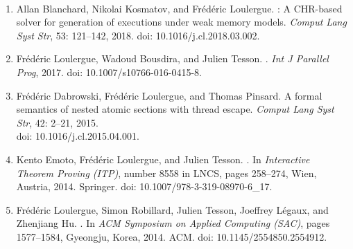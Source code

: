 \documentclass[11pt]{article}
\begin{document}
 ~

\begin{enumerate}
  
  \providecommand{\natexlab}[1]{#1}
  \providecommand{\url}[1]{\texttt{#1}}
  \expandafter\ifx\csname urlstyle\endcsname\relax
  \providecommand{\doi}[1]{doi: #1}\else
  \providecommand{\doi}{doi: \begingroup \urlstyle{rm}\Url}\fi

\item Allan Blanchard, Nikolai Kosmatov, and Fr\'{e}d\'{e}ric
  Loulergue.  : A {CHR}-based solver for
  generation of executions under weak memory models.  \newblock
  \emph{Comput Lang Syst Str}, 53: 121--142, 2018.  \newblock
  \doi{10.1016/j.cl.2018.03.002}.


\item Fr\'{e}d\'{e}ric Loulergue, Wadoud Bousdira, and Julien Tesson.
  .  \newblock \emph{Int J Parallel Prog}, 2017.
  \newblock \doi{10.1007/s10766-016-0415-8}.

\item Fr\'ed\'eric Dabrowski, Fr\'ed\'eric Loulergue, and Thomas
  Pinsard.  \newblock A formal semantics of nested atomic sections
  with thread escape.
  \newblock \emph{Comput Lang Syst Str}, 42: 2--21, 2015.\\
  \newblock \doi{10.1016/j.cl.2015.04.001}.
  
\item Kento Emoto, Fr\'{e}d\'{e}ric Loulergue, and Julien Tesson.
  .  \newblock In \emph{Interactive
    Theorem Proving (ITP)}, number 8558 in LNCS, pages 258--274, Wien,
  Austria, 2014. Springer.  \newblock
  \doi{10.1007/978-3-319-08970-6_17}.

\item Fr\'ed\'eric Loulergue, Simon Robillard, Julien Tesson, Joeffrey
  L\'{e}gaux, and Zhenjiang Hu.  .  \newblock In \emph{ACM Symposium on Applied
    Computing (SAC)}, pages 1577--1584, Gyeongju, Korea, 2014. ACM.
  \newblock \doi{10.1145/2554850.2554912}.

    
\end{enumerate}

\end{document}
